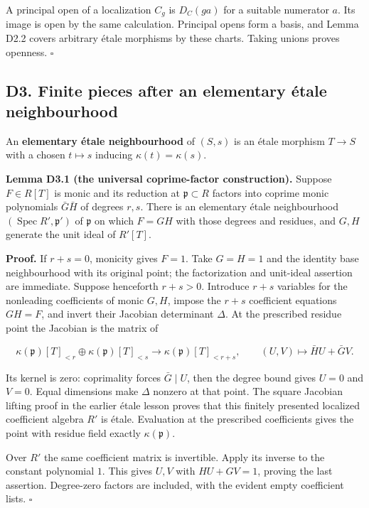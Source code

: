 \documentclass[11pt,a4paper,openany]{report}
\begin{document}
A principal open of a localization \(C_g\) is \(D_C(ga)\) for a suitable numerator \(a\). Its image is open by the same calculation. Principal opens form a basis, and Lemma D2.2 covers arbitrary étale morphisms by these charts. Taking unions proves openness. \(\square\)

\subsection{D3. Finite pieces after an elementary étale neighbourhood}\label{AG-RG-S04-d3.-finite-pieces-after-an-elementary-uxe9tale-neighbourhood}

An \textbf{elementary étale neighbourhood} of \((S,s)\) is an étale morphism \(T\to S\) with a chosen \(t\mapsto s\) inducing \(\kappa(t)=\kappa(s)\).

\textbf{Lemma D3.1 (the universal coprime-factor construction).} Suppose \(F\in R[T]\) is monic and its reduction at \(\mathfrak p\subset R\) factors into coprime monic polynomials \(\bar G\bar H\) of degrees \(r,s\). There is an elementary étale neighbourhood \((\operatorname{Spec}R',\mathfrak p')\) of \(\mathfrak p\) on which \(F=GH\) with those degrees and residues, and \(G,H\) generate the unit ideal of \(R'[T]\).

\textbf{Proof.} If \(r+s=0\), monicity gives \(F=1\). Take \(G=H=1\) and the identity base neighbourhood with its original point; the factorization and unit-ideal assertion are immediate. Suppose henceforth \(r+s>0\). Introduce \(r+s\) variables for the nonleading coefficients of monic \(G,H\), impose the \(r+s\) coefficient equations \(GH=F\), and invert their Jacobian determinant \(\Delta\). At the prescribed residue point the Jacobian is the matrix of

\[
\kappa(\mathfrak p)[T]_{<r}\oplus\kappa(\mathfrak p)[T]_{<s}
\longrightarrow\kappa(\mathfrak p)[T]_{<r+s},
\qquad (U,V)\longmapsto\bar H U+\bar G V.
\]

Its kernel is zero: coprimality forces \(\bar G\mid U\), then the degree bound gives \(U=0\) and \(V=0\). Equal dimensions make \(\Delta\) nonzero at that point. The square Jacobian lifting proof in the earlier étale lesson proves that this finitely presented localized coefficient algebra \(R'\) is étale. Evaluation at the prescribed coefficients gives the point with residue field exactly \(\kappa(\mathfrak p)\).

Over \(R'\) the same coefficient matrix is invertible. Apply its inverse to the constant polynomial \(1\). This gives \(U,V\) with \(HU+GV=1\), proving the last assertion. Degree-zero factors are included, with the evident empty coefficient lists. \(\square\)
\end{document}
